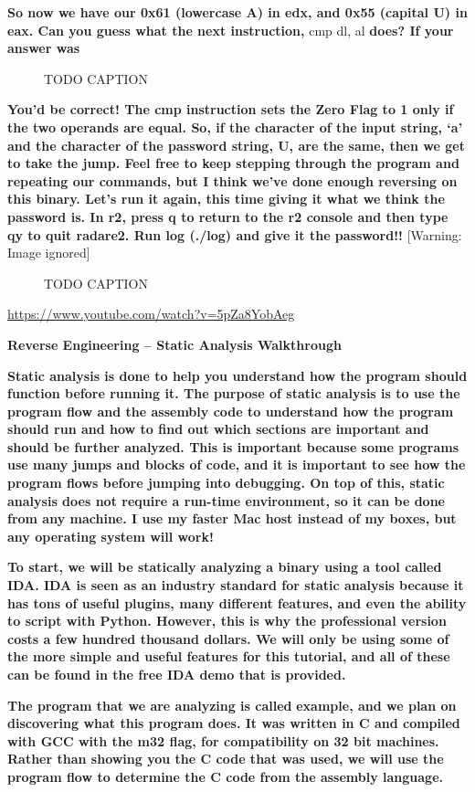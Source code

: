 \documentclass[letterpaper]{article}
\newcommand{\sitfig}[3]{
\begin{figure}[H]
\centering
\makebox[\textwidth][c]{
#2
}
\caption{#3}
\label{#1}
\end{figure}
}
\newcommand{\sitgfx}[4][scale=1.0]{
\sitfig{#3}{\texttt{[image: \#2]}}{#4}
}
\begin{document}
\textbf{So now we have our 0x61 (lowercase A) in edx, and 0x55 (capital U) in eax. Can you guess what the next
instruction, }cmp dl, al \textbf{does? If your answer was }  
\sitgfx[width=6.5in,height=1.8055in]{FINALWORKINGDOCFORMERLYPRECURSOR-img043.png}{fig:unk}{TODO CAPTION}
 

\textbf{You'd be correct! The cmp instruction sets the Zero Flag to 1 only if the two operands are equal. So, if the
character of the input string, `a' and the character of the password string, U, are the same, then we get to take the
jump. Feel free to keep stepping through the program and repeating our commands, but I think we've done enough
reversing on this binary. Let's run it again, this time giving it what we think the password is. In r2, press q to
return to the r2 console and then type qy to quit radare2. Run log (./log) and give it the password!! }  [Warning:
Image ignored] %
\sitgfx[width=6.4165in,height=1.3126in]{FINALWORKINGDOCFORMERLYPRECURSOR-img044.png}{fig:unk}{TODO CAPTION}
\url{https://www.youtube.com/watch?v=5pZa8YobAeg}

{\centering
\textbf{Reverse Engineering -- Static Analysis Walkthrough}
\par}

\textbf{Static analysis is done to help you understand how the program should function before running it. The purpose of
static analysis is to use the program flow and the assembly code to understand how the program should run and how to
find out which sections are important and should be further analyzed. This is important because some programs use many
jumps and blocks of code, and it is important to see how the program flows before jumping into debugging. On top of
this, static analysis does not require a run-time environment, so it can be done from any machine. I use my faster Mac
host instead of my boxes, but any operating system will work!}

\textbf{To start, we will be statically analyzing a binary using a tool called IDA. IDA is seen as an industry standard
for static analysis because it has tons of useful plugins, many different features, and even the ability to script with
Python. However, this is why the professional version costs a few hundred thousand dollars. We will only be using some
of the more simple and useful features for this tutorial, and all of these can be found in the free IDA demo that is
provided.}

\textbf{The program that we are analyzing is called
}\textbf{\textcolor[rgb]{0.21960784,0.4627451,0.11372549}{example}}\textbf{, and we plan on discovering what this
program does. It was written in C and compiled with GCC with the m32 flag, for compatibility on 32 bit machines. Rather
than showing you the C code that was used, we will use the program flow to determine the C code from the assembly
language.}
\end{document}
